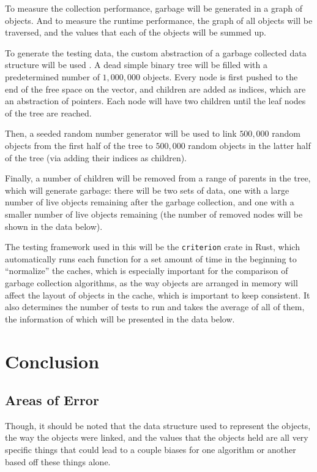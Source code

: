 \documentclass[index]{subfiles}
\begin{document}
To measure the collection performance, garbage will be generated in a graph of objects. And to measure the runtime performance, the graph of all objects will be traversed, and the values that each of the objects will be summed up. 

To generate the testing data, the custom abstraction of a garbage collected data structure will be used \cite{youtube_introductory_video}. A dead simple binary tree will be filled with a predetermined number of \(1,000,000\) objects. Every node is first pushed to the end of the free space on the vector, and children are added as indices, which are an abstraction of pointers. Each node will have two children until the leaf nodes of the tree are reached. 

Then, a seeded random number generator will be used to link \(500,000\) random objects from the first half of the tree to \(500,000\) random objects in the latter half of the tree (via adding their indices as children).

Finally, a number of children will be removed from a range of parents in the tree, which will generate garbage: there will be two sets of data, one with a large number of live objects remaining after the garbage collection, and one with a smaller number of live objects remaining (the number of removed nodes will be shown in the data below). 

The testing framework used in this will be the \verb+criterion+ crate in Rust, which automatically runs each function for a set amount of time in the beginning to ``normalize'' the caches, which is especially important \cite{a_unified_theory_of_garbage_collection} for the comparison of garbage collection algorithms, as the way objects are arranged in memory will affect the layout of objects in the cache, which is important to keep consistent. It also determines the number of tests to run and takes the average of all of them, the information of which will be presented in the data below.

\section{Conclusion}
\subsection{Areas of Error}

Though, it should be noted that the data structure used to represent the objects, the way the objects were linked, and the values that the objects held are all very specific things that could lead to a couple biases for one algorithm or another based off these things alone.
\end{document}
